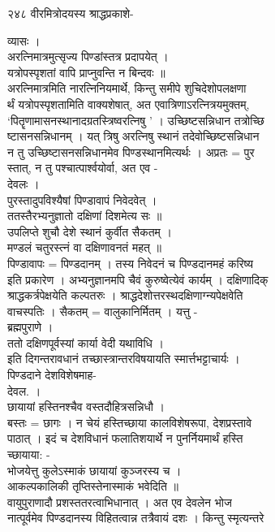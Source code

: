 \documentclass[11pt, openany]{book}
\begin{document}
{{{{{{{{२४८ वीरमित्रोदयस्य श्राद्धप्रकाशे-

{व्यासः ।\\
अरत्निमात्रमुत्सृज्य पिण्डांस्तत्र प्रदापयेत् ।\\
यत्रोपस्पृशतां वापि प्राप्नुवन्ति न बिन्दवः ॥\\
अरत्निमात्रमिति नारत्निनियमार्थे, किन्तु समीपे शुचिदेशोपलक्षणा\\
र्थं यत्रोपस्पृशतामिति वाक्यशेषात्, अत एवात्रिणाऽरत्नित्रयमुक्तम्,\\
`पितॄणामासनस्थानादग्रतस्त्रिष्वरत्निषु ' । उच्छिष्टसन्निधान तत्रोच्छि\\
ष्टासनसन्निधानम् । यत् त्रिषु अरत्निषु स्थानं तदेवोच्छिष्टसन्निधान\\
न तु उच्छिष्टासनसन्निधानमेव पिण्डस्थानमित्यर्थः । अप्रतः = पुर\\
स्तात्, न तु पश्चात्पार्श्वयोर्वा, अत एव -\\
देवलः ।\\
पुरस्तादुपविश्यैषां पिण्डावापं निवेदवेत् ।\\
ततस्तैरभ्यनुज्ञातो दक्षिणां दिशमेत्य सः ॥\\
उपलिप्ते शुचौ देशे स्थानं कुर्वीत सैकतम् ।\\
मण्डलं चतुरस्त्नं वा दक्षिणावनतं महत् ॥\\
पिण्डावापः = पिण्डदानम् । तस्य निवेदनं च पिण्डदानमहं करिष्य\\
इति प्रकारेण । अभ्यनुज्ञानमपि चैवं कुरुष्वेत्येवं कार्यम् ।
दक्षिणादिक्\\
श्राद्धकर्त्रपेक्षयेति कल्पतरुः ।
श्राद्धदेशोत्तरस्थदक्षिणाग्न्यपेक्षवेति\\
वाचस्पतिः । सैकतम् = वालुकानिर्मितम् । यत्तु -\\
ब्रह्मपुराणे ।\\
ततो दक्षिणपूर्वस्यां कार्या वेदी यथाविधि ।\\
इति दिगन्तरावधानं तच्छास्त्रान्तरविषयायति स्मार्त्तभट्टाचार्यः ।\\
पिण्डदाने देशविशेषमाह-\\
देवल. ।\\
छायायां हस्तिनश्चैव वस्तदौहित्रसन्निधौ ।\\
बस्तः = छागः । न चेयं हस्तिच्छाया कालविशेषरूपा, देशप्रस्तावे\\
पाठात् । इदं च देशविधानं फलातिशयार्थे न पुनर्नियमार्थं हस्ति\\
च्छायाया: -\\
भोजयेत्तु कुलेऽस्माकं छायायां कुञ्जरस्य च ।\\
आकल्पकालिकी तृप्तिस्तेनास्माकं भवेदिति ॥\\
वायुपुराणादौ प्रशस्ततरत्वाभिधानात् । अत एव देवलेन भोज\\
नात्पूर्वमेव पिण्डदानस्य विहितत्वान्न तत्रैवायं दशः । किन्तु
स्मृत्यन्तरे

}}}}}}}}}
\end{document}
